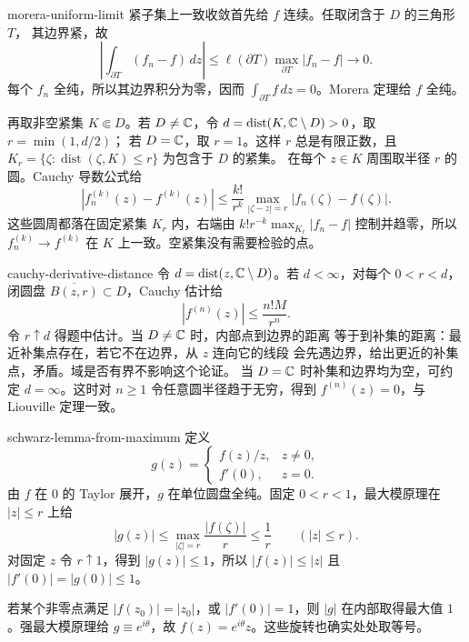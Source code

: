 \begin{solution}{morera-uniform-limit}
紧子集上一致收敛首先给 \(f\) 连续。任取闭含于 \(D\) 的三角形 \(T\)，
其边界紧，故
\[
 \left|\int_{\partial T}(f_n-f)\,dz\right|
 \le \ell(\partial T)\max_{\partial T}|f_n-f|\to0.
\]
每个 \(f_n\) 全纯，所以其边界积分为零，因而
\(\int_{\partial T}f\,dz=0\)。Morera 定理给 \(f\) 全纯。

再取非空紧集 \(K\Subset D\)。若 \(D\ne\mathbb{C}\)，令
\(d=\operatorname{dist}(K,\mathbb{C}\setminus D)>0\)，取 \(r=\min(1,d/2)\)；
若 \(D=\mathbb{C}\)，取 \(r=1\)。这样 \(r\) 总是有限正数，且
\(K_r=\{\zeta:\operatorname{dist}(\zeta,K)\le r\}\) 为包含于 \(D\) 的紧集。
在每个 \(z\in K\) 周围取半径 \(r\) 的圆。Cauchy 导数公式给
\[
 |f_n^{(k)}(z)-f^{(k)}(z)|
 \le \frac{k!}{r^k}
 \max_{|\zeta-z|=r}|f_n(\zeta)-f(\zeta)|.
\]
这些圆周都落在固定紧集 \(K_r\) 内，右端由
\(k!r^{-k}\max_{K_r}|f_n-f|\) 控制并趋零，所以
\(f_n^{(k)}\to f^{(k)}\) 在 \(K\) 上一致。空紧集没有需要检验的点。
\end{solution}

\begin{solution}{cauchy-derivative-distance}
令 \(d=\operatorname{dist}(z,\mathbb{C}\setminus D)\)。若 \(d<\infty\)，对每个
\(0<r<d\)，闭圆盘 \(\overline{B(z,r)}\subset D\)，Cauchy 估计给
\[
 |f^{(n)}(z)|\le\frac{n!M}{r^n}.
\]
令 \(r\uparrow d\) 得题中估计。当 \(D\ne\mathbb{C}\) 时，内部点到边界的距离
等于到补集的距离：最近补集点存在，若它不在边界，从 \(z\) 连向它的线段
会先遇边界，给出更近的补集点，矛盾。域是否有界不影响这个论证。
当 \(D=\mathbb{C}\) 时补集和边界均为空，可约定
\(d=\infty\)。这时对 \(n\ge1\) 令任意圆半径趋于无穷，得到
\(f^{(n)}(z)=0\)，与 Liouville 定理一致。
\end{solution}

\begin{solution}{schwarz-lemma-from-maximum}
定义
\[
 g(z)=
 \begin{cases}f(z)/z,&z\ne0,\\ f'(0),&z=0.\end{cases}
\]
由 \(f\) 在 \(0\) 的 Taylor 展开，\(g\) 在单位圆盘全纯。固定
\(0<r<1\)，最大模原理在 \(|z|\le r\) 上给
\[
 |g(z)|\le\max_{|\zeta|=r}\frac{|f(\zeta)|}{r}\le\frac1r
 \qquad(|z|\le r).
\]
对固定 \(z\) 令 \(r\uparrow1\)，得到 \(|g(z)|\le1\)，所以
\(|f(z)|\le|z|\) 且 \(|f'(0)|=|g(0)|\le1\)。

若某个非零点满足 \(|f(z_0)|=|z_0|\)，或 \(|f'(0)|=1\)，则 \(|g|\)
在内部取得最大值 \(1\)。强最大模原理给 \(g\equiv e^{i\theta}\)，故
\(f(z)=e^{i\theta}z\)。这些旋转也确实处处取等号。
\end{solution}

